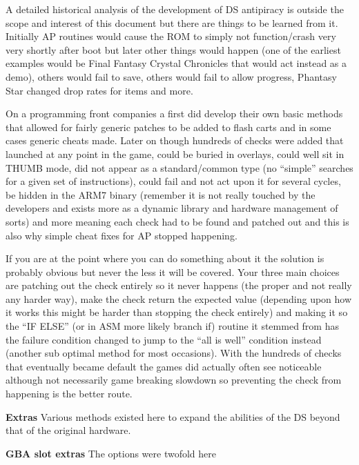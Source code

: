 \documentclass[
]{book}
\begin{document}
A detailed historical analysis of the development of DS antipiracy is outside the scope and interest of this document but there are things to be learned from it. Initially AP routines would cause the ROM to simply not function/crash very very shortly after boot but later other things would happen (one of the earliest examples would be Final Fantasy Crystal Chronicles that would act instead as a demo), others would fail to save, others would fail to allow progress, Phantasy Star changed drop rates for items and more.

On a programming front companies a first did develop their own basic methods that allowed for fairly generic patches to be added to flash carts and in some cases generic cheats made. Later on though hundreds of checks were added that launched at any point in the game, could be buried in overlays, could well sit in THUMB mode, did not appear as a standard/common type (no ``simple'' searches for a given set of instructions), could fail and not act upon it for several cycles, be hidden in the ARM7 binary (remember it is not really touched by the developers and exists more as a dynamic library and hardware management of sorts) and more meaning each check had to be found and patched out and this is also why simple cheat fixes for AP stopped happening.

If you are at the point where you can do something about it the solution is probably obvious but never the less it will be covered. Your three main choices are patching out the check entirely so it never happens (the proper and not really any harder way), make the check return the expected value (depending upon how it works this might be harder than stopping the check entirely) and making it so the ``IF ELSE'' (or in ASM more likely branch if) routine it stemmed from has the failure condition changed to jump to the ``all is well'' condition instead (another sub optimal method for most occasions). With the hundreds of checks that eventually became default the games did actually often see noticeable although not necessarily game breaking slowdown so preventing the check from happening is the better route.

\textbf{Extras} Various methods existed here to expand the abilities of the DS beyond that of the original hardware.

\textbf{GBA slot extras} The options were twofold here
\end{document}
